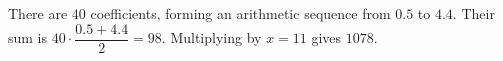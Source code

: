 There are $40$ coefficients, forming an arithmetic sequence from $0.5$ to $4.4$. Their sum is $40\cdot\dfrac{0.5+4.4}{2}=98$. Multiplying by $x=11$ gives $\boxed{1078}$.
